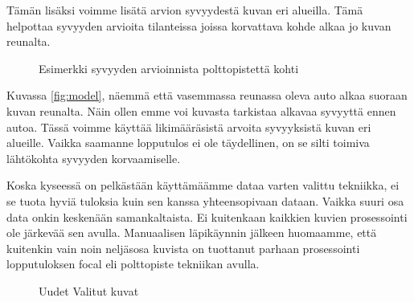 Tämän lisäksi voimme lisätä arvion syvyydestä kuvan eri alueilla. 
Tämä helpottaa syvyyden arvioita tilanteissa joissa korvattava kohde alkaa jo kuvan reunalta.

\begin{figure}[h]
\centering
{}
\caption{Esimerkki syvyyden arvioinnista polttopistettä kohti}
\label{fig:polttopiste_2}
\end{figure}
    
Kuvassa \ref{fig:model}, näemmä että vasemmassa reunassa oleva auto alkaa suoraan kuvan reunalta.
Näin ollen emme voi kuvasta tarkistaa alkavaa syvyyttä ennen autoa.
Tässä voimme käyttää likimääräsistä arvoita syvyyksistä kuvan eri alueille. Vaikka saamanne lopputulos ei ole täydellinen,
on se silti toimiva lähtökohta syvyyden korvaamiselle.

Koska kyseessä on pelkästään käyttämäämme dataa varten valittu tekniikka, ei se tuota hyviä tuloksia kuin sen kanssa yhteensopivaan dataan.
Vaikka suuri osa data onkin keskenään samankaltaista. Ei kuitenkaan kaikkien kuvien prosessointi ole järkevää sen avulla.
Manuaalisen läpikäynnin jälkeen huomaamme, että kuitenkin vain noin neljäsosa kuvista on tuottanut parhaan prosessointi lopputuloksen focal eli polttopiste tekniikan avulla. 

\begin{figure}[h]
\centering
{}
\caption{Uudet Valitut kuvat}
\label{fig:selected2}
\end{figure}

